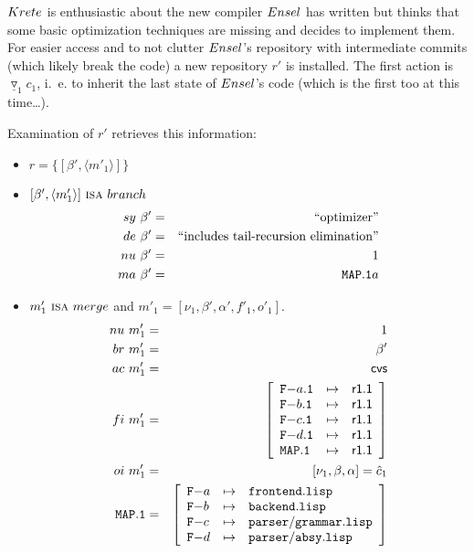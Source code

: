 \documentclass[fleqn, 10pt, a4paper]{report}
\begin{document}
$\mathnormal{Krete}$ is enthusiastic about the new compiler
$\mathnormal{Ensel}$ has written but thinks that some basic
optimization techniques are missing and decides to implement
them. For easier access and to not clutter $\mathnormal{Ensel}$'s
repository with intermediate commits (which likely break the code)
a new repository $r'$ is installed. The first action is
$\underline{\triangledown}_1 c_1$, i.~e. to inherit the last
state of $\mathnormal{Ensel}$'s code (which is the first too at
this time\ldots).

Examination of $r'$ retrieves this information:

\begin{itemize}
\item $r=\{[\beta', \langle m'_1\rangle]\}$
\item $[\beta',\langle m'_1\rangle]\ \mbox{\textsc{isa}}\ \mathnormal{branch}$
\begin{eqnarray*}
\mathnormal{sy}\ \beta' &=& \mbox{``optimizer''} \\
\mathnormal{de}\ \beta' &=& \mbox{``includes tail-recursion elimination''} \\
\mathnormal{nu}\ \beta' &=& 1 \\
\mathnormal{ma}\ \beta' &=& \mathtt{MAP.1}a
\end{eqnarray*}

\item $m'_1\ \mbox{\textsc{isa}}\ \mathnormal{merge}$ and
$m'_1=[\nu_1, \beta', \alpha', f'_1, o'_1]$.
\begin{eqnarray*}
\mathnormal{nu}\ m'_1 &=& 1 \\
\mathnormal{br}\ m'_1 &=& \beta' \\
\mathnormal{ac}\ m'_1 &=& \mathsf{cvs} \\
\mathnormal{fi}\ m'_1 &=& \left[
\begin{array}{lcl}
\mathtt{F-}a\mathtt{.1} & \mapsto & \mathsf{r1.1} \\
\mathtt{F-}b\mathtt{.1} & \mapsto & \mathsf{r1.1} \\
\mathtt{F-}c\mathtt{.1} & \mapsto & \mathsf{r1.1} \\
\mathtt{F-}d\mathtt{.1} & \mapsto & \mathsf{r1.1} \\
\mathtt{MAP.1}         & \mapsto & \mathsf{r1.1} \\
\end{array}\right] \\
\mathnormal{oi}\ m'_1 &=& [\nu_1, \beta, \alpha] = \hat c_1 \\
\mathtt{MAP.1} &=& \left[
\begin{array}{lcl}
\mathtt{F-}a &\mapsto& \mathtt{frontend.lisp} \\
\mathtt{F-}b &\mapsto& \mathtt{backend.lisp} \\
\mathtt{F-}c &\mapsto& \mathtt{parser/grammar.lisp} \\
\mathtt{F-}d &\mapsto& \mathtt{parser/absy.lisp} \\
\end{array}\right]
\end{eqnarray*}
\end{itemize}
\end{document}
